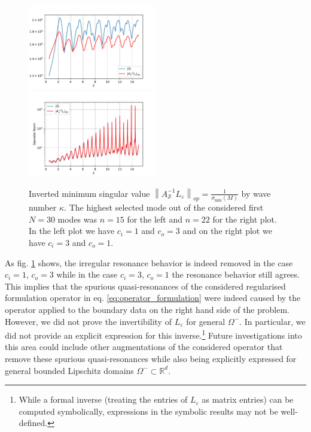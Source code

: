\documentclass[12pt,journal,compsoc, onecolumn]{IEEEtran}
\begin{document}
\begin{figure}
    \includegraphics[width=0.5\textwidth]{InvertedMinimumSingularValuec_i1.0c_o3.0N_30eta1.0plotRangeStart_0,5plotRangeEnd_15shiftFirstValue_FalseremoveResonances_Trueindexrange_-15,0-0,0.pdf}
    \includegraphics[width=0.5\textwidth]{InvertedMinimumSingularValuec_i3,0c_o1,0N_30eta1,0plotRangeStart_0,5plotRangeEnd_15shiftFirstValue_FalseremoveResonances_Trueindexrange_-22,0-0,0.pdf}
    \caption{Inverted minimum singular value $\left\|A_{\mathcal{S}}^{-1}L_\varepsilon\right\|_{o p} =\frac{1}{\sigma_{\min }(M)}$ by wave number $\kappa$. The highest selected mode out of the considered first $N = 30$ modes was $n = 15$ for the left and $n =22$ for the right plot.
    In the left plot we have $c_i = 1$ and $c_o = 3$
    and on the right plot we have $c_i = 3$ and $c_o = 1$. }
   \label{fig:regularised_results}
\end{figure}
\noindent
As fig. \ref{fig:regularised_results} shows, the irregular resonance  behavior is indeed removed in the case $c_i = 1$, $c_o = 3$ while in the case $c_i = 3$, $c_o = 1$ the resonance behavior still agrees. This implies that the spurious quasi-resonances of the considered regularised formulation operator in eq. \ref{eq:operator_formulation} were indeed caused by the operator applied to the boundary data on the right hand side of the problem. \\
However, we did not prove the invertibility of $L_\varepsilon$ for general $\Omega^-$. In particular, we did not provide an explicit expression for this inverse.\footnote{While a formal inverse (treating the entries of $L_\varepsilon$ as matrix entries) can be computed symbolically, expressions in the symbolic results may not be well-defined.} Future investigations into this area could include other augmentations of the considered operator that remove these spurious quasi-resonances while also being explicitly expressed for general bounded Lipschitz domains $\Omega^- \subset \mathbb{R}^d$. 
\end{document}
